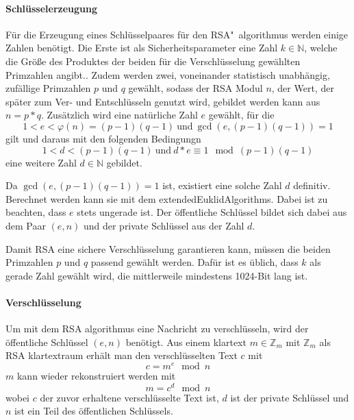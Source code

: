 \paragraph[Schlüsselerzeugung]{Schlüsselerzeugung}\label{par:schluesselerzeugung}
Für die Erzeugung eines Schlüsselpaares für den \ac{RSA}"~\gls{algorithmus} werden einige Zahlen benötigt. Die Erste ist als Sicherheitsparameter eine Zahl \(k \in \mathbb{N}\), welche die Größe des Produktes der beiden für die Verschlüsselung gewählten Primzahlen angibt.. 
Zudem werden zwei, voneinander statistisch unabhängig, zufällige Primzahlen $p$ und $q$ gewählt, sodass der \ac{RSA} Modul $n$, der Wert, der später zum Ver- und Entschlüsseln genutzt wird, gebildet werden kann aus \(n = p*q\).
Zusätzlich wird eine natürliche Zahl $e$ gewählt, für die
\begin{equation}
    1 < e < \varphi(n) = (p - 1)(q - 1)\ \text{und}\ \gcd(e, (p-1)(q-1)) = 1
\end{equation}
gilt und daraus mit den folgenden Bedingungn
\begin{equation}
    1 < d < (p-1)(q-1)\ \text{und}\ d*e \equiv 1\mod(p-1)(q-1)
\end{equation}
eine weitere Zahl \(d \in \mathbb{N}\) gebildet.

Da $\gcd(e, (p-1)(q-1)) = 1$ ist, existiert eine solche Zahl $d$ definitiv. Berechnet werden kann sie mit dem \glspl{extendedEuklidAlgorithm}. Dabei ist zu beachten, dass $e$ stets ungerade ist. Der öffentliche Schlüssel bildet sich dabei aus dem Paar $(e, n)$ und der private Schlüssel aus der Zahl $d$. \autocite[\pagef~169]{buchmann_einfuhrung_2016}

Damit \ac{RSA} eine sichere Verschlüsselung garantieren kann, müssen die beiden Primzahlen $p$ und $q$ passend gewählt werden. Dafür ist es üblich, dass $k$ als gerade Zahl gewählt wird, die mittlerweile mindestens 1024-Bit lang ist. \autocite[\pagef~169]{buchmann_einfuhrung_2016}

\paragraph{Verschlüsselung}\label{par:verschluesselung}
Um mit dem \ac{RSA} \gls{algorithmus} eine Nachricht zu verschlüsseln, wird der öffentliche Schlüssel $(e, n)$ benötigt. Aus einem \gls{klartext} \(m \in \mathbb{Z}_m\) mit \(\mathbb{Z}_m\) als \ac{RSA} \gls{klartextraum} erhält man den verschlüsselten Text $c$ mit
\begin{equation}
    c = m^e\mod n
\end{equation}
$m$ kann wieder rekonstruiert werden mit
\begin{equation}
    m = c^d \mod n
\end{equation}
wobei $c$ der zuvor erhaltene verschlüsselte Text ist, $d$ ist der private Schlüssel und $n$ ist ein Teil des öffentlichen Schlüssels. \autocite[\pagef~6]{rsa-encryption}

